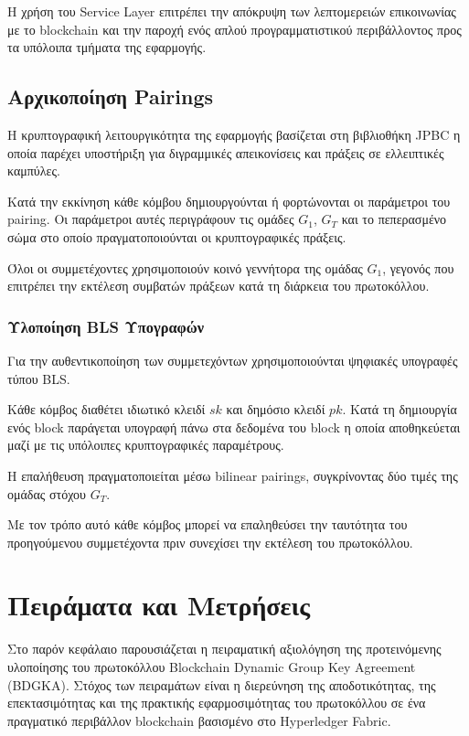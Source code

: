 \documentclass[12pt,a4paper]{report}
\begin{document}
Η χρήση του Service Layer επιτρέπει την απόκρυψη των
λεπτομερειών επικοινωνίας με το blockchain και την
παροχή ενός απλού προγραμματιστικού περιβάλλοντος
προς τα υπόλοιπα τμήματα της εφαρμογής.

\section{Αρχικοποίηση Pairings}

Η κρυπτογραφική λειτουργικότητα της εφαρμογής βασίζεται
στη βιβλιοθήκη JPBC η οποία παρέχει υποστήριξη για
διγραμμικές απεικονίσεις και πράξεις σε ελλειπτικές
καμπύλες.

Κατά την εκκίνηση κάθε κόμβου δημιουργούνται ή φορτώνονται
οι παράμετροι του pairing. Οι παράμετροι αυτές περιγράφουν
τις ομάδες \(G_1\), \(G_T\) και το πεπερασμένο σώμα στο
οποίο πραγματοποιούνται οι κρυπτογραφικές πράξεις.

Όλοι οι συμμετέχοντες χρησιμοποιούν κοινό γεννήτορα της
ομάδας \(G_1\), γεγονός που επιτρέπει την εκτέλεση
συμβατών πράξεων κατά τη διάρκεια του πρωτοκόλλου.

\subsection{Υλοποίηση BLS Υπογραφών}

Για την αυθεντικοποίηση των συμμετεχόντων χρησιμοποιούνται
ψηφιακές υπογραφές τύπου BLS.

Κάθε κόμβος διαθέτει ιδιωτικό κλειδί \(sk\) και δημόσιο
κλειδί \(pk\). Κατά τη δημιουργία ενός block παράγεται
υπογραφή πάνω στα δεδομένα του block η οποία αποθηκεύεται
μαζί με τις υπόλοιπες κρυπτογραφικές παραμέτρους.

Η επαλήθευση πραγματοποιείται μέσω bilinear pairings,
συγκρίνοντας δύο τιμές της ομάδας στόχου \(G_T\).

Με τον τρόπο αυτό κάθε κόμβος μπορεί να επαληθεύσει
την ταυτότητα του προηγούμενου συμμετέχοντα πριν
συνεχίσει την εκτέλεση του πρωτοκόλλου.


\chapter{Πειράματα και Μετρήσεις}

Στο παρόν κεφάλαιο παρουσιάζεται η πειραματική αξιολόγηση της προτεινόμενης υλοποίησης του πρωτοκόλλου Blockchain Dynamic Group Key Agreement (BDGKA).
Στόχος των πειραμάτων είναι η διερεύνηση της αποδοτικότητας, της επεκτασιμότητας και της πρακτικής εφαρμοσιμότητας του πρωτοκόλλου σε ένα πραγματικό περιβάλλον blockchain βασισμένο στο Hyperledger Fabric.
\end{document}
